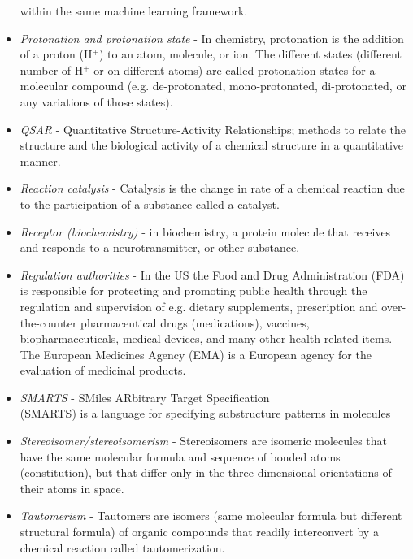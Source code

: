 \documentclass{sig-alternate}
\begin{document}
\begin{itemize}
    within the same machine learning framework.
\item \textit{Protonation and protonation state} - In chemistry, protonation is the addition of a proton (H$^+$) to
    an atom, molecule, or ion. The different states (different number of H$^+$ or on different atoms) are called
    protonation states for a molecular compound (e.g. de-protonated, mono-protonated, di-protonated, or any
    variations of those states).
\item \textit{QSAR} - Quantitative Structure-Activity Relationships; methods to relate the structure and the
    biological activity of a chemical structure in a quantitative manner.
\item \textit{Reaction catalysis} - Catalysis is the change in rate of a chemical reaction due to the participation
    of a substance called a catalyst.
\item \textit{Receptor (biochemistry)} - in biochemistry, a protein molecule that receives and responds to a
    neurotransmitter, or other substance.
\item \textit{Regulation authorities} - In the US the Food and Drug Administration (FDA) is responsible for
    protecting and promoting public health through the regulation and supervision of e.g. dietary supplements,
    prescription and over-the-counter pharmaceutical drugs (medications), vaccines, biopharmaceuticals, medical
    devices, and many other health related items. The European Medicines Agency (EMA) is a European agency for the
    evaluation of medicinal products.
\item \textit{SMARTS} - SMiles ARbitrary Target Specification \\(SMARTS) is a language for specifying substructure
    patterns in molecules
\item \textit{Stereoisomer/stereoisomerism} - Stereoisomers are isomeric molecules that have the same molecular
    formula and sequence of bonded atoms (constitution), but that differ only in the three-dimensional orientations
    of their atoms in space.
\item \textit{Tautomerism} - Tautomers are isomers (same molecular formula but different structural formula) of
    organic compounds that readily interconvert by a chemical reaction called tautomerization.
\end{itemize}
%
\end{document}
